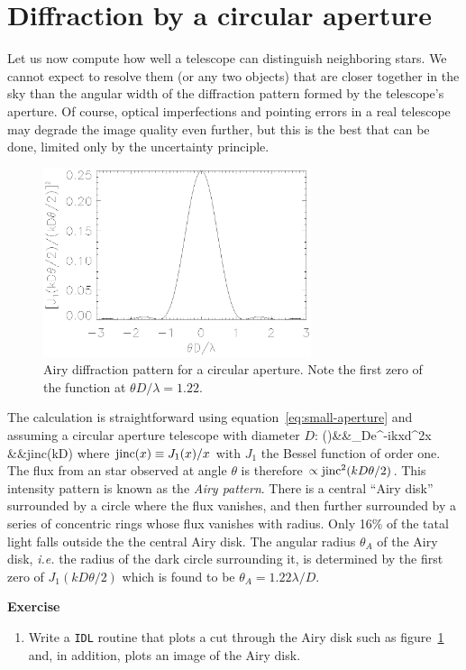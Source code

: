\section{Diffraction by a circular aperture}

Let us now compute how well a telescope can distinguish neighboring stars. We cannot expect to
resolve them (or any two objects) that are closer together in the sky than the angular width
of the diffraction pattern formed by the telescope's aperture. Of course, optical imperfections
and pointing errors in a real telescope may degrade the image quality even further, but this
is the best that can be done, limited only by the uncertainty principle.

\begin{figure}[th!]
	\centering
	\includegraphics[width=0.7\textwidth]{jinc2.eps}
  \caption{Airy diffraction pattern for a circular aperture. Note the first zero
of the function at $\theta D/\lambda=1.22$.}
  \label{fig:jinc2}
\end{figure}

The calculation is straightforward using equation~\ref{eq:small-aperture} and assuming a circular
aperture telescope with diameter $D$:
\bua
\psi(\theta)&\propto&\int_{\pi D}e^{-ik{\bm x}\cdot{\bm\theta}}d^2x \\
            &\propto&{\rm jinc}\left({kD\theta{}}\right)
\eua
where ${\rm jinc}(x)\equiv {J_1(x)/x}$ with $J_1$ the Bessel function of order one. The
flux from an star observed at angle $\theta$ is therefore $\propto{\rm jinc}^2({kD\theta/2})$.
This intensity pattern is known as the {\it Airy pattern}. There is a central ``Airy disk'' 
surrounded by a circle where the flux vanishes, and then further surrounded by a series of 
concentric rings whose flux vanishes with radius. Only 16\% of the tatal light falls outside
the the central Airy disk. The angular radius $\theta_A$ of the Airy disk, {\it i.e.} the 
radius of the dark circle surrounding it, is determined by the first zero of 
$J_1({kD\theta/2})$ which is found to be $\theta_A={1.22\lambda/D}$. 

{\bf Exercise}

\begin{enumerate}
\setcounter{enumi}{\value{count}}
\item Write a {\tt IDL} routine that plots a cut through the Airy disk such as figure~\ref{fig:jinc2}
and, in addition, plots an image of the Airy disk.
\setcounter{count}{\value{enumi}}
\end{enumerate}


%

